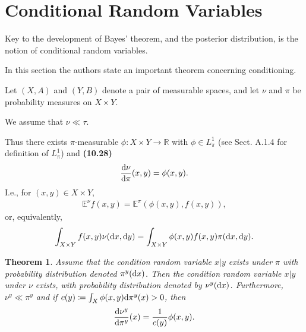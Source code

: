 \documentclass[oneside,11pt]{book}
\numberwithin{equation}{section}
\newtheorem{theorem}{Theorem}[section]
\begin{document}
\section{Conditional Random Variables}
Key to the development of Bayes' theorem, and the posterior distribution, is the notion of conditional random variables.

In this section the authors state an important theorem concerning conditioning.

%
Let $(X,A)$ and $(Y,B)$ denote a pair of measurable spaces, and let $\nu$ and $\pi$ be probability measures on $X\times Y$.

We assume that $\nu\ll\tau$.

Thus there exists $\pi$-measurable $\phi:X\times Y\to\mathbb{R}$ with $\phi\in L_\pi^1$ (see Sect. A.1.4 for definition of $L_\pi^1$) and \textbf{(10.28)}
\begin{align*}
    \frac{{\rm d}\nu}{{\rm d}\pi}(x,y) = \phi(x,y).
\end{align*}
I.e., for $(x,y)\in X\times Y$,
\begin{align*}
    \mathbb{E}^\nu f(x,y) = \mathbb{E}^\pi(\phi(x,y),f(x,y)),
\end{align*}
or, equivalently,
\begin{align*}
    \int_{X\times Y} f(x,y)\nu({\rm d}x,{\rm d}y) = \int_{X\times Y} \phi(x,y)f(x,y)\pi({\rm d}x,{\rm d}y).
\end{align*}

\begin{theorem}
    Assume that the condition random variable $x|y$ exists under $\pi$ with probability distribution denoted $\pi^y({\rm d}x)$. Then the condition random variable $x|y$ under $\nu$ exists, with probability distribution denoted by $\nu^y({\rm d}x)$. Furthermore, $\nu^y\ll\pi^y$ and if $c(y)\coloneqq\int_X \phi(x,y){\rm d}\pi^y(x) > 0$, then
    \begin{align*}
        \frac{{\rm d}\nu^y}{{\rm d}\pi^y}(x) = \frac{1}{c(y)}\phi(x,y).
    \end{align*}
\end{theorem}
\end{document}
